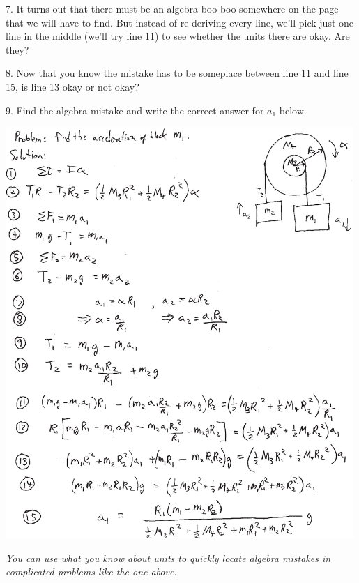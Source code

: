 7. It turns out that there must be an algebra boo-boo somewhere on the page that we will have to find.  But instead of re-deriving every line, we'll pick just one line in the middle (we'll try line 11) to see whether the units there are okay.  Are they?
\vspace{0.4in}

8. Now that you know the mistake has to be someplace between line 11 and line 15, is line 13 okay or not okay?
\vspace{0.4in}

9. Find the algebra mistake and write the correct answer for $a_1$ below.
\vspace{0.5in}

\newpage

\begin{center}
\includegraphics[width=0.99\textwidth]{check_your_units/find_the_error_using_units2.eps}
\end{center}

\textit{You can use what you know about units to quickly locate algebra mistakes in complicated problems like the one above.}




